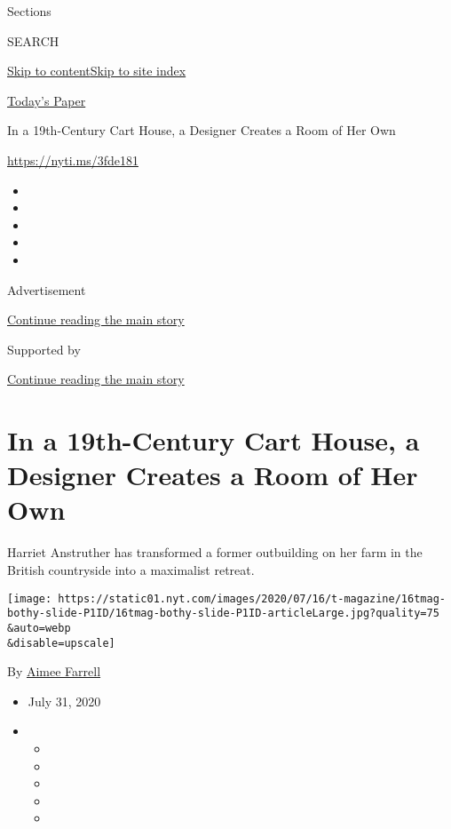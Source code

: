 Sections

SEARCH

\protect\hyperlink{site-content}{Skip to
content}\protect\hyperlink{site-index}{Skip to site index}

\href{https://myaccount.nytimes.com/auth/login?response_type=cookie\&client_id=vi}{}

\href{https://www.nytimes.com/section/todayspaper}{Today's Paper}

In a 19th-Century Cart House, a Designer Creates a Room of Her Own

\url{https://nyti.ms/3fde181}

\begin{itemize}
\item
\item
\item
\item
\item
\end{itemize}

Advertisement

\protect\hyperlink{after-top}{Continue reading the main story}

Supported by

\protect\hyperlink{after-sponsor}{Continue reading the main story}

\hypertarget{in-a-19th-century-cart-house-a-designer-creates-a-room-of-her-own}{%
\section{In a 19th-Century Cart House, a Designer Creates a Room of Her
Own}\label{in-a-19th-century-cart-house-a-designer-creates-a-room-of-her-own}}

Harriet Anstruther has transformed a former outbuilding on her farm in
the British countryside into a maximalist retreat.

\texttt{[image: https://static01.nyt.com/images/2020/07/16/t-magazine/16tmag-bothy-slide-P1ID/16tmag-bothy-slide-P1ID-articleLarge.jpg?quality=75\\\&auto=webp\\\&disable=upscale]}

By \href{https://www.nytimes.com/by/aimee-farrell}{Aimee Farrell}

\begin{itemize}
\item
  July 31, 2020
\item
  \begin{itemize}
  \item
  \item
  \item
  \item
  \item
  \end{itemize}
\end{itemize}

